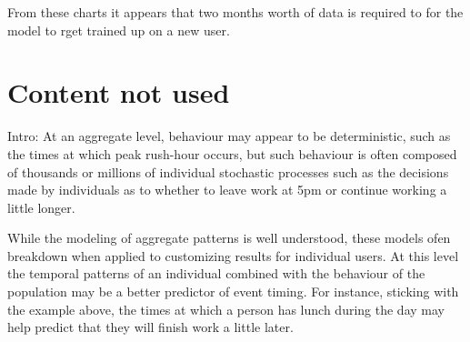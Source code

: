 From these charts it appears that two months worth of data is required to for the model to rget trained up on a new user.


\section{Content not used} %

Intro:
At an aggregate level, behaviour may appear to be deterministic, such as the times at which peak rush-hour occurs, but such behaviour is often composed of thousands or millions of individual stochastic processes such as the decisions made by individuals as to whether to leave work at 5pm or continue working a little longer.

While the modeling of aggregate patterns is well understood, these models ofen breakdown when applied to customizing results for individual users. At this level the temporal patterns of an individual combined with the behaviour of the population may be a better predictor of event timing. For instance, sticking with the example above, the times at which a person has lunch during the day may help predict that they will finish work a little later.

